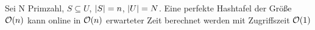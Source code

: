                     \begin{satz}
                        Sei N Primzahl, $S \subseteq U$, $\lvert S\rvert=n$, $\lvert U\rvert=N$. Eine perfekte Hashtafel der Größe $\mathcal{O}(n)$ kann online in $\mathcal{O}(n)$ erwarteter Zeit berechnet werden mit Zugriffszeit $\mathcal{O}(1)$
                    \end{satz}
                    
                    
                    
                    
            
            
        
    